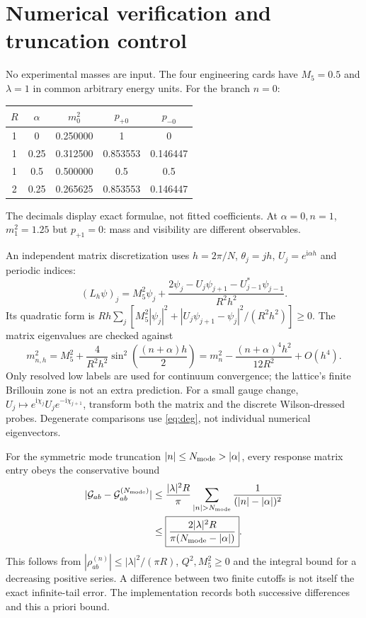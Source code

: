 \documentclass[11pt,a4paper]{article}
\newcommand{\ii}{\mathrm{i}}
\newcommand{\cG}{\mathcal G}
\begin{document}
\section{Numerical verification and truncation control}
No experimental masses are input. The four engineering cards have
$M_5=0.5$ and $\lambda=1$ in common arbitrary energy units.
For the branch $n=0$:
\begin{center}
\begin{tabular}{ccccc}
\toprule
$R$ & $\alpha$ & $m_0^2$ & $p_{+0}$ & $p_{-0}$\\
\midrule
1 & 0 & 0.250000 & 1 & 0\\
1 & 0.25 & 0.312500 & 0.853553 & 0.146447\\
1 & 0.5 & 0.500000 & 0.5 & 0.5\\
2 & 0.25 & 0.265625 & 0.853553 & 0.146447\\
\bottomrule
\end{tabular}
\end{center}
The decimals display exact formulae, not fitted coefficients.
At $\alpha=0,n=1$, $m_1^2=1.25$ but $p_{+1}=0$:
mass and visibility are different observables.

An independent matrix discretization uses $h=2\pi/N$,
$\theta_j=jh$, $U_j=e^{\ii\alpha h}$ and periodic indices:
\begin{equation}
 (L_h\psi)_j=M_5^2\psi_j+
 \frac{2\psi_j-U_j\psi_{j+1}-U_{j-1}^*\psi_{j-1}}{R^2h^2}.
\end{equation}
Its quadratic form is
$Rh\sum_j[M_5^2|\psi_j|^2+
|U_j\psi_{j+1}-\psi_j|^2/(R^2h^2)]\geq0$.
The matrix eigenvalues are checked against
\begin{equation}
 m_{n,h}^2=M_5^2+
 \frac{4}{R^2h^2}\sin^2\left(\frac{(n+\alpha)h}{2}\right)
 =m_n^2-\frac{(n+\alpha)^4h^2}{12R^2}+O(h^4).
\end{equation}
Only resolved low labels are used for continuum convergence;
the lattice's finite Brillouin zone is not an extra prediction.
For a small gauge change, $U_j\mapsto
e^{\ii\chi_j}U_je^{-\ii\chi_{j+1}}$, transform both the matrix
and the discrete Wilson-dressed probes. Degenerate comparisons use
\eqref{eq:deg}, not individual numerical eigenvectors.

For the symmetric mode truncation $|n|\leq N_{\rm mode}>|\alpha|$,
every response matrix entry obeys the conservative bound
\begin{align}
 |\cG_{ab}-\cG^{(N_{\rm mode})}_{ab}|
 &\leq \frac{|\lambda|^2 R}{\pi}
       \sum_{|n|>N_{\rm mode}}\frac{1}{(|n|-|\alpha|)^2}\\
 &\leq\boxed{\frac{2|\lambda|^2R}
                   {\pi(N_{\rm mode}-|\alpha|)}} .
\end{align}
This follows from $|\rho^{(n)}_{ab}|\leq|\lambda|^2/(\pi R)$,
$Q^2,M_5^2\geq0$ and the integral bound for a decreasing positive
series. A difference between two finite cutoffs is not itself the
exact infinite-tail error. The implementation records both successive
differences and this a priori bound.
\end{document}
